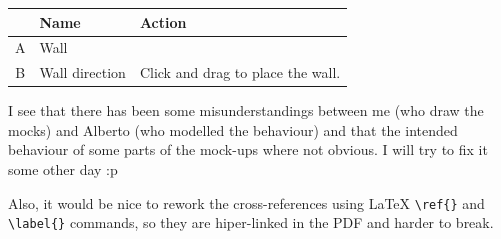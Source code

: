 \documentclass[12pt,a4paper]{article}
\begin{document}
\begin{table}[H]
\small
\centering
\begin{tabular}{c|p{5cm}|p{7cm}}
& Name & Action \\ \hline\hline
A
&Wall
&
\\B
&Wall direction
&Click and drag to place the wall.
\end{tabular}
\end{table}

\begin{todo}
I see that there has been some misunderstandings between me (who draw
the mocks) and Alberto (who modelled the behaviour) and that the
intended behaviour of some parts of the mock-ups where not obvious. I
will try to fix it some other day :p

Also, it would be nice to rework the cross-references using \LaTeX 
\verb|\ref{}| and \verb|\label{}| commands, so they are hiper-linked in
the PDF and harder to break.

\end{todo}

\newpage
\startappendix
\end{document}
